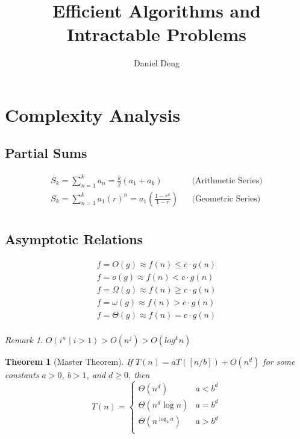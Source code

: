 \documentclass[11pt]{article}
\title{Efficient Algorithms and Intractable Problems}
\author{Daniel Deng}
\date{}
\newtheorem{theorem}{Theorem}[section]
\theoremstyle{definition}
\theoremstyle{remark}
\newtheorem*{remark}{Remark}
\begin{document}
\maketitle

\section{Complexity Analysis}
\subsection{Partial Sums}
\begin{align*}
S_k = \sum_{n=1}^k a_n = \frac{k}{2}(a_1+a_k) && \text{(Arithmetic Series)} \\
S_k = \sum_{n=1}^k a_1(r)^n = a_1 \left(\frac{1-r^k}{1-r}\right) && \text{(Geometric Series)} \\
\end{align*}

\subsection{Asymptotic Relations}
\begin{align*}
f = O(g) \approx f(n) \leq c\cdot g(n) \\
f = o(g) \approx f(n) < c\cdot g(n) \\
f = \Omega(g) \approx f(n) \geq c\cdot g(n) \\
f = \omega(g) \approx f(n) > c\cdot g(n) \\
f = \Theta(g) \approx f(n) = c\cdot g(n) \\
\end{align*}

\begin{remark}
$O(i^n \mid i > 1) > O(n^j) > O(log^k n)$
\end{remark}

\begin{theorem}[Master Theorem]
If $T(n)=aT([n/b])+O(n^d)$ for some constants $a>0$, $b>1$, and $d\geq 0$, then
\begin{equation*}
T(n)=\begin{cases}
\Theta(n^d) &a<b^d \\
\Theta(n^d \log n) & a = b^d \\
\Theta(n^{\log_b a}) & a > b^d \\
\end{cases}
\end{equation*}
\end{theorem}
\clearpage
\end{document}
